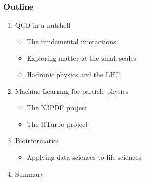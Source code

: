 \documentclass[aspectratio=43]{beamer}
\begin{document}
\begin{frame}

	\frametitle{Outline}
	
	\begin{enumerate}
		\item {\color{blue}QCD in a nutshell}
		\begin{itemize}
			\item The fundamental interactions
			\item Exploring matter at the small scales
			\item Hadronic physics and the LHC
		\end{itemize}
		\item {\color{blue}Machine Learning for particle physics}
		\begin{itemize}	
			\item The N3PDF project
			\item The HTurbo project
		\end{itemize}	
		\item {\color{blue}Bioinformatics}
		\begin{itemize}
			\item Applying data sciences to life sciences
		\end{itemize}
		\item {\color{blue}Summary}
	\end{enumerate}
	
\end{frame}

\begin{frame}


\end{frame}
\end{document}
